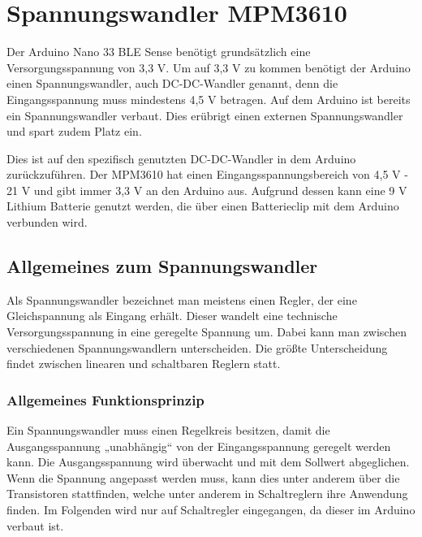 %
%
%


\chapter{Spannungswandler MPM3610}\label{MPM}

Der Arduino Nano 33 BLE Sense benötigt grundsätzlich eine Versorgungsspannung von 3,3 V. Um auf 3,3 V zu kommen benötigt der Arduino einen Spannungswandler, auch DC-DC-Wandler genannt, denn die Eingangsspannung muss mindestens 4,5 V betragen. Auf dem Arduino ist bereits ein Spannungswandler verbaut. Dies erübrigt einen externen Spannungswandler und spart zudem Platz ein. \cite{ArduinoDoc:2024}

\bigskip

Dies ist auf den spezifisch genutzten DC-DC-Wandler in dem Arduino zurückzuführen. Der MPM3610 hat einen Eingangsspannungsbereich von 4,5  V - 21 V und gibt immer 3,3 V an den Arduino aus. Aufgrund dessen kann eine 9 V Lithium Batterie genutzt werden, die über einen Batterieclip mit dem Arduino verbunden wird. \cite{ArduinoDoc:2024} \cite{MPS:2015}

\section{Allgemeines zum Spannungswandler}

Als Spannungswandler bezeichnet man meistens einen Regler, der eine Gleichspannung als Eingang erhält. Dieser wandelt eine technische Versorgungsspannung in eine geregelte Spannung um.  Dabei kann man zwischen verschiedenen Spannungswandlern unterscheiden. Die größte Unterscheidung findet zwischen linearen und schaltbaren Reglern statt. \cite{Ekbert:2014}

\subsection{Allgemeines Funktionsprinzip}

Ein Spannungswandler muss einen Regelkreis besitzen, damit die Ausgangsspannung „unabhängig“ von der Eingangsspannung geregelt werden kann. Die Ausgangsspannung wird überwacht und mit dem Sollwert abgeglichen. Wenn die Spannung angepasst werden muss, kann dies unter anderem über die Transistoren stattfinden, welche unter anderem in Schaltreglern ihre Anwendung finden. Im Folgenden wird nur auf Schaltregler eingegangen, da dieser im Arduino verbaut ist.  \cite{Ekbert:2014} \cite{ArduinoDoc:2024}



